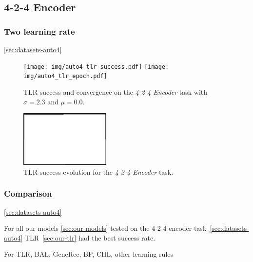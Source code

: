 \subsection{4-2-4 Encoder} 

\subsubsection{Two learning rate} 
\label{sec:tlr-auto4} 
\ref{sec:datasets-auto4} 
\begin{figure}[H]
  \centering
  \texttt{[image: img/auto4\_tlr\_success.pdf]}   
  \texttt{[image: img/auto4\_tlr\_epoch.pdf]}     
  \caption{TLR success and convergence on the \emph{4-2-4 Encoder} task with $\sigma = 2.3$ and $\mu = 0.0$.}
  \label{fig:results-tlr-auto4-performance}
\end{figure}

\begin{figure}[H]
  \centering
  \includegraphics[width=0.4\textwidth]{img/placeholder.png}    
  \caption{TLR success evolution for the \emph{4-2-4 Encoder} task.}
  \label{fig:results-tlr-auto4-epoch} 
\end{figure}

\subsubsection{Comparison} 
\ref{sec:datasets-auto4} 

For all our models \ref{sec:our-models} tested on the 4-2-4 encoder task~\ref{sec:datasets-auto4} TLR~\ref{sec:our-tlr} had the best success rate. 

For TLR, BAL, GeneRec, BP, CHL, other learning rules

